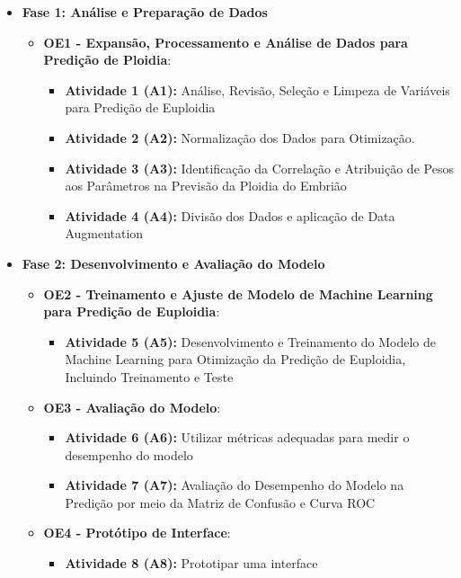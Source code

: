 \begin{itemize}
    \item \textbf{Fase 1: Análise e Preparação de Dados}
    \begin{itemize}
        \item \textbf{OE1 - Expansão, Processamento e Análise de Dados para Predição de Ploidia}: 
        \begin{itemize}
            \item \textbf{Atividade 1 (A1):} Análise, Revisão, Seleção e Limpeza de Variáveis para Predição de Euploidia 
            \item \textbf{Atividade 2 (A2):} Normalização dos Dados para Otimização.
            \item \textbf{Atividade 3 (A3):} Identificação da Correlação e Atribuição de Pesos aos Parâmetros na Previsão da Ploidia do Embrião 
            \item \textbf{Atividade 4 (A4):} Divisão dos Dados e aplicação de Data Augmentation
        \end{itemize}
    \end{itemize}

    \item \textbf{Fase 2: Desenvolvimento e Avaliação do Modelo}
    \begin{itemize}
        \item \textbf{OE2 - Treinamento e Ajuste de Modelo de Machine Learning para Predição de Euploidia}: 
        \begin{itemize}
            \item \textbf{Atividade 5 (A5):} Desenvolvimento e Treinamento do Modelo de Machine Learning para Otimização da Predição de Euploidia, Incluindo Treinamento e Teste
        \end{itemize}

        \item \textbf{OE3 - Avaliação do Modelo}: 
        \begin{itemize}
            \item \textbf{Atividade 6 (A6):} Utilizar métricas adequadas para medir o desempenho do modelo
            \item \textbf{Atividade 7 (A7):} Avaliação do Desempenho do Modelo na Predição por meio da Matriz de Confusão e Curva ROC
        \end{itemize}

        \item \textbf{OE4 - Protótipo de Interface}: 
        \begin{itemize}
            \item \textbf{Atividade 8 (A8):} Prototipar uma interface
        \end{itemize}
    \end{itemize}
\end{itemize}

